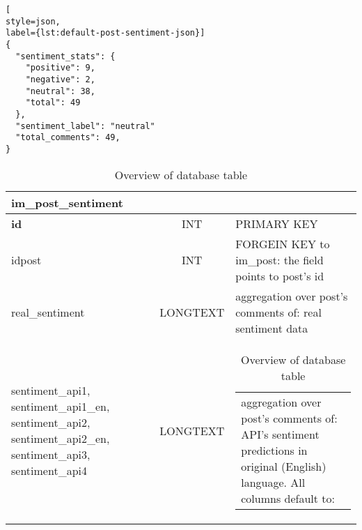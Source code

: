 \newsavebox\postsentimentexample

\begin{lrbox}{\postsentimentexample}
\begin{lstlisting}[
style=json,
label={lst:default-post-sentiment-json}]
{
  "sentiment_stats": {
    "positive": 9, 
    "negative": 2,
    "neutral": 38, 
    "total": 49
  }, 
  "sentiment_label": "neutral"
  "total_comments": 49,
}
\end{lstlisting}
\end{lrbox}


\begin{table}[H]
\centering
\onehalfspacing

\begin{tabularx}{0.95\textwidth}{ m{35mm} || c | X }
	\hline
	\multicolumn{3}{l}{ \textbf{im\_post\_sentiment} } \\ \hline
	\hline
	\textbf{id} & INT & PRIMARY KEY \\ \hline  
    idpost & INT & FORGEIN KEY to im\_post: \newline the field points to post's id \\ \hline  
    real\_sentiment & LONGTEXT & aggregation over post's comments of: real sentiment data \\ \hline 
	sentiment\_api1,
	sentiment\_api1\_en, 
	sentiment\_api2, 
	sentiment\_api2\_en,
	sentiment\_api3, 
	sentiment\_api4 & LONGTEXT & 
	\begin{tabular}[t]{ m{60mm}}
		aggregation over post's comments of:
		API's sentiment predictions in original (English) language.
		All \inlinecode{sentiment\_api} columns default to:\newline
		\usebox\postsentimentexample 
  	\end{tabular}\\ \hline


\end{tabularx}
\caption{Overview of  database table}
\label{tab:im-post-sentiment}

\end{table}